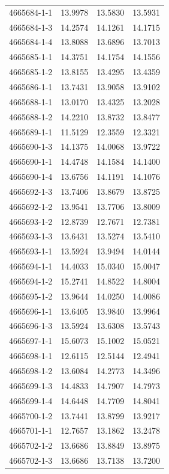\begin{longtable}{lrrr}
4665684-1-1 & 13.9978 & 13.5830 & 13.5931 \\
4665684-1-3 & 14.2574 & 14.1261 & 14.1715 \\
4665684-1-4 & 13.8088 & 13.6896 & 13.7013 \\
4665685-1-1 & 14.3751 & 14.1754 & 14.1556 \\
4665685-1-2 & 13.8155 & 13.4295 & 13.4359 \\
4665686-1-1 & 13.7431 & 13.9058 & 13.9102 \\
4665688-1-1 & 13.0170 & 13.4325 & 13.2028 \\
4665688-1-2 & 14.2210 & 13.8732 & 13.8477 \\
4665689-1-1 & 11.5129 & 12.3559 & 12.3321 \\
4665690-1-3 & 14.1375 & 14.0068 & 13.9722 \\
4665690-1-1 & 14.4748 & 14.1584 & 14.1400 \\
4665690-1-4 & 13.6756 & 14.1191 & 14.1076 \\
4665692-1-3 & 13.7406 & 13.8679 & 13.8725 \\
4665692-1-2 & 13.9541 & 13.7706 & 13.8009 \\
4665693-1-2 & 12.8739 & 12.7671 & 12.7381 \\
4665693-1-3 & 13.6431 & 13.5274 & 13.5410 \\
4665693-1-1 & 13.5924 & 13.9494 & 14.0144 \\
4665694-1-1 & 14.4033 & 15.0340 & 15.0047 \\
4665694-1-2 & 15.2741 & 14.8522 & 14.8004 \\
4665695-1-2 & 13.9644 & 14.0250 & 14.0086 \\
4665696-1-1 & 13.6405 & 13.9840 & 13.9964 \\
4665696-1-3 & 13.5924 & 13.6308 & 13.5743 \\
4665697-1-1 & 15.6073 & 15.1002 & 15.0521 \\
4665698-1-1 & 12.6115 & 12.5144 & 12.4941 \\
4665698-1-2 & 13.6084 & 14.2773 & 14.3496 \\
4665699-1-3 & 14.4833 & 14.7907 & 14.7973 \\
4665699-1-4 & 14.6448 & 14.7709 & 14.8041 \\
4665700-1-2 & 13.7441 & 13.8799 & 13.9217 \\
4665701-1-1 & 12.7657 & 13.1862 & 13.2478 \\
4665702-1-2 & 13.6686 & 13.8849 & 13.8975 \\
4665702-1-3 & 13.6686 & 13.7138 & 13.7200 \\

\end{longtable}
